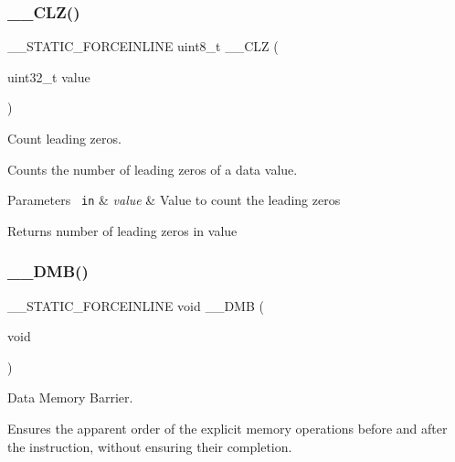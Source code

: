 \subsubsection{\texorpdfstring{\_\_CLZ()}{\_\_CLZ()}}
{\footnotesize\ttfamily \+\_\+\+\_\+\+S\+T\+A\+T\+I\+C\+\_\+\+F\+O\+R\+C\+E\+I\+N\+L\+I\+NE uint8\+\_\+t \+\_\+\+\_\+\+C\+LZ (\begin{DoxyParamCaption}\item[{uint32\+\_\+t}]{value }\end{DoxyParamCaption})}



Count leading zeros. 

Counts the number of leading zeros of a data value. 
\begin{DoxyParams}[1]{Parameters}
\mbox{\texttt{ in}}  & {\em value} & Value to count the leading zeros \\
\hline
\end{DoxyParams}
\begin{DoxyReturn}{Returns}
number of leading zeros in value 
\end{DoxyReturn}
\mbox{\label{group___c_m_s_i_s___core___instruction_interface_gab1ea24daaaaee9c828f90cbca330cb5e}} 
\subsubsection{\texorpdfstring{\_\_DMB()}{\_\_DMB()}}
{\footnotesize\ttfamily \+\_\+\+\_\+\+S\+T\+A\+T\+I\+C\+\_\+\+F\+O\+R\+C\+E\+I\+N\+L\+I\+NE void \+\_\+\+\_\+\+D\+MB (\begin{DoxyParamCaption}\item[{void}]{ }\end{DoxyParamCaption})}



Data Memory Barrier. 

Ensures the apparent order of the explicit memory operations before and after the instruction, without ensuring their completion. \mbox{\label{group___c_m_s_i_s___core___instruction_interface_ga7fe277f5385d23b9c44b2cbda1577ce9}} 
